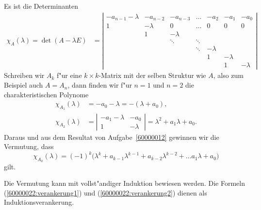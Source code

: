 \begin{loesung}
Es ist die Determinanten
\begin{align*}
\chi_A(\lambda)
=
\det(A-\lambda E)
&=
\left|\begin{matrix}
-a_{n-1}-\lambda&-a_{n-2}&-a_{n-3}&\dots & -a_2   & -a_1   & -a_0  \\
   1            &-\lambda&   0    &\dots &   0    &   0    &   0   \\
                &   1    &-\lambda&      &        &        &       \\
                &        &\ddots  &\ddots&        &        &       \\
                &        &        &\ddots&-\lambda&        &       \\
                &        &        &      &   1    &-\lambda&       \\
                &        &        &      &        &   1    &-\lambda
\end{matrix}\right|
\end{align*}
Schreiben wir $A_k$ f"ur eine $k\times k$-Matrix mit der selben
Struktur wie $A$, also zum Beispiel auch $A=A_n$, dann finden wir
f"ur $n=1$ und $n=2$ die charakteristischen Polynome
\begin{align}
\chi_{A_1}(\lambda)
&=
-a_0-\lambda = -(\lambda+a_0),
\label{60000022:verankerung1}
\\
\chi_{A_2}(\lambda)
&=
\left|\begin{matrix}
-a_1-\lambda&  -a_0  \\
1           &-\lambda
\end{matrix}\right|
=\lambda^2+a_1\lambda+a_0.
\label{60000022:verankerung2}
\end{align}
Daraus und aus dem Resultat von Aufgabe~\ref{60000012} gewinnen wir
die Vermutung, dass 
\[
\chi_{A_k}(\lambda)
=
(-1)^k\bigl(
\lambda^k+a_{k-1}\lambda^{k-1}+a_{k-2}\lambda^{k-2}+\dots a_1\lambda+a_0
\bigr)
\]
gilt.

Die Vermutung kann mit vollst"andiger Induktion bewiesen werden.
Die Formeln (\ref{60000022:verankerung1}) und (\ref{60000022:verankerung2})
dienen als Induktionsverankerung.


\end{loesung}
